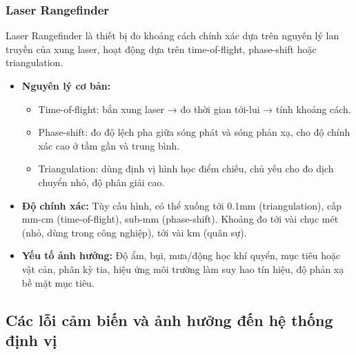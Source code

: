 \subsubsection{Laser Rangefinder}
Laser Rangefinder là thiết bị đo khoảng cách chính xác dựa trên nguyên lý lan truyền của xung laser, hoạt động dựa trên time-of-flight, phase-shift hoặc triangulation.
\begin{itemize}
    \item \textbf{Nguyên lý cơ bản:}
    \begin{itemize}
        \item Time-of-flight: bắn xung laser → đo thời gian tới-lui → tính khoảng cách.
        \item Phase-shift: đo độ lệch pha giữa sóng phát và sóng phản xạ, cho độ chính xác cao ở tầm gần và trung bình.
        \item Triangulation: dùng định vị hình học điểm chiếu, chủ yếu cho đo dịch chuyển nhỏ, độ phân giải cao.
    \end{itemize}
    \item \textbf{Độ chính xác:} Tùy cấu hình, có thể xuống tới 0.1mm (triangulation), cấp mm-cm (time-of-flight), sub-mm (phase-shift). Khoảng đo tới vài chục mét (nhỏ, dùng trong công nghiệp), tới vài km (quân sự).
    \item \textbf{Yếu tố ảnh hưởng:} Độ ẩm, bụi, mưa/động học khí quyển, mục tiêu hoặc vật cản, phân kỳ tia, hiệu ứng môi trường làm suy hao tín hiệu, độ phản xạ bề mặt mục tiêu.
\end{itemize}

\subsection{Các lỗi cảm biến và ảnh hưởng đến hệ thống định vị}
